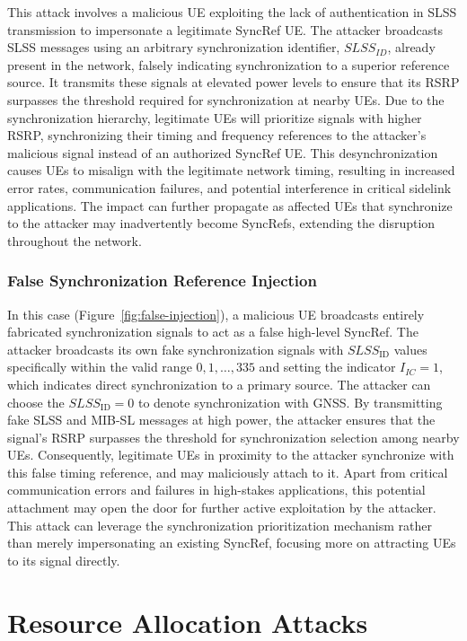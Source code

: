 This attack involves a malicious UE exploiting the lack of authentication in SLSS transmission to impersonate a legitimate SyncRef UE. The attacker broadcasts SLSS messages using an arbitrary synchronization identifier, $SLSS_{ID}$, already present in the network, falsely indicating synchronization to a superior reference source. It transmits these signals at elevated power levels to ensure that its RSRP surpasses the threshold required for synchronization at nearby UEs. Due to the synchronization hierarchy, legitimate UEs will prioritize signals with higher RSRP, synchronizing their timing and frequency references to the attacker’s malicious signal instead of an authorized SyncRef UE. This desynchronization causes UEs to misalign with the legitimate network timing, resulting in increased error rates, communication failures, and potential interference in critical sidelink applications. The impact can further propagate as affected UEs that synchronize to the attacker may inadvertently become SyncRefs, extending the disruption throughout the network.

\subsubsection{False Synchronization Reference Injection}

In this case (Figure~\ref{fig:false-injection}), a malicious UE broadcasts entirely fabricated synchronization signals to act as a false high-level SyncRef. The attacker broadcasts its own fake synchronization signals with $SLSS_{\text{ID}}$ values specifically within the valid range ${0, 1, \dots, 335}$ and setting the indicator $I_{IC} = 1$, which indicates direct synchronization to a primary source. The attacker can choose the $SLSS_{\text{ID}} = 0$ to denote synchronization with GNSS. By transmitting fake SLSS and MIB-SL messages at high power, the attacker ensures that the signal's RSRP surpasses the threshold for synchronization selection among nearby UEs. Consequently, legitimate UEs in proximity to the attacker synchronize with this false timing reference, and may maliciously attach to it. Apart from critical communication errors and failures in high-stakes applications, this potential attachment may open the door for further active exploitation by the attacker. This attack can leverage the synchronization prioritization mechanism rather than merely impersonating an existing SyncRef, focusing more on attracting UEs to its signal directly.

\section{Resource Allocation Attacks} \label{sec:resource}

